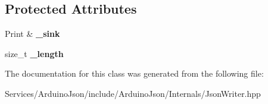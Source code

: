 \subsection*{Protected Attributes}
\begin{DoxyCompactItemize}
\item 
\hypertarget{class_arduino_json_1_1_internals_1_1_json_writer_a61c8af5b5665d3836dedf28a41127f56}{}Print \& {\bfseries \+\_\+sink}\label{class_arduino_json_1_1_internals_1_1_json_writer_a61c8af5b5665d3836dedf28a41127f56}

\item 
\hypertarget{class_arduino_json_1_1_internals_1_1_json_writer_a513a8602e4a333abf9c70601ff0b1c67}{}size\+\_\+t {\bfseries \+\_\+length}\label{class_arduino_json_1_1_internals_1_1_json_writer_a513a8602e4a333abf9c70601ff0b1c67}

\end{DoxyCompactItemize}


The documentation for this class was generated from the following file\+:\begin{DoxyCompactItemize}
\item 
Services/\+Arduino\+Json/include/\+Arduino\+Json/\+Internals/Json\+Writer.\+hpp\end{DoxyCompactItemize}
